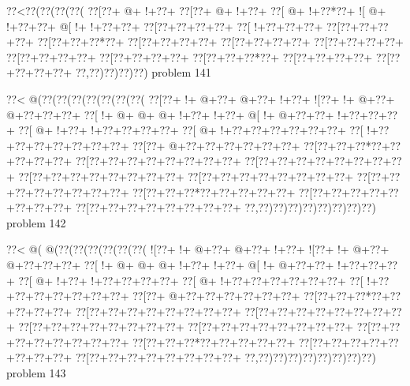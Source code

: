 \vbox{\vbox{\goo
\0??<\0??(\0??(\0??(\0??(
\0??[\0??+\- @+\- !+\0??+
\0??[\0??+\- @+\- !+\0??+
\0??[\- @+\- !+\0??*\0??+
\- ![\- @+\- !+\0??+\0??+
\- @[\- !+\- !+\0??+\0??+
\0??[\0??+\0??+\0??+\0??+
\0??[\- !+\0??+\0??+\0??+
\0??[\0??+\0??+\0??+\0??+
\0??[\0??+\0??+\0??*\0??+
\0??[\0??+\0??+\0??+\0??+
\0??[\0??+\0??+\0??+\0??+
\0??[\0??+\0??+\0??+\0??+
\0??[\0??+\0??+\0??+\0??+
\0??[\0??+\0??+\0??+\0??+
\0??[\0??+\0??+\0??*\0??+
\0??[\0??+\0??+\0??+\0??+
\0??[\0??+\0??+\0??+\0??+
\0??,\0??)\0??)\0??)\0??)
}
\hfil problem 141\hfil\break
}

\vbox{\vbox{\goo
\0??<\- @(\0??(\0??(\0??(\0??(\0??(\0??(\0??(
\0??[\0??+\- !+\- @+\0??+\- @+\0??+\- !+\0??+
\- ![\0??+\- !+\- @+\0??+\- @+\0??+\0??+\0??+
\0??[\- !+\- @+\- @+\- @+\- !+\0??+\- !+\0??+
\- @[\- !+\- @+\0??+\0??+\- !+\0??+\0??+\0??+
\0??[\- @+\- !+\0??+\- !+\0??+\0??+\0??+\0??+
\0??[\- @+\- !+\0??+\0??+\0??+\0??+\0??+\0??+
\0??[\- !+\0??+\0??+\0??+\0??+\0??+\0??+\0??+
\0??[\0??+\- @+\0??+\0??+\0??+\0??+\0??+\0??+
\0??[\0??+\0??+\0??*\0??+\0??+\0??+\0??+\0??+
\0??[\0??+\0??+\0??+\0??+\0??+\0??+\0??+\0??+
\0??[\0??+\0??+\0??+\0??+\0??+\0??+\0??+\0??+
\0??[\0??+\0??+\0??+\0??+\0??+\0??+\0??+\0??+
\0??[\0??+\0??+\0??+\0??+\0??+\0??+\0??+\0??+
\0??[\0??+\0??+\0??+\0??+\0??+\0??+\0??+\0??+
\0??[\0??+\0??+\0??*\0??+\0??+\0??+\0??+\0??+
\0??[\0??+\0??+\0??+\0??+\0??+\0??+\0??+\0??+
\0??[\0??+\0??+\0??+\0??+\0??+\0??+\0??+\0??+
\0??,\0??)\0??)\0??)\0??)\0??)\0??)\0??)\0??)
}
\hfil problem 142\hfil\break
}

\vbox{\vbox{\goo
\0??<\- @(\- @(\0??(\0??(\0??(\0??(\0??(\0??(
\- ![\0??+\- !+\- @+\0??+\- @+\0??+\- !+\0??+
\- ![\0??+\- !+\- @+\0??+\- @+\0??+\0??+\0??+
\0??[\- !+\- @+\- @+\- @+\- !+\0??+\- !+\0??+
\- @[\- !+\- @+\0??+\0??+\- !+\0??+\0??+\0??+
\0??[\- @+\- !+\0??+\- !+\0??+\0??+\0??+\0??+
\0??[\- @+\- !+\0??+\0??+\0??+\0??+\0??+\0??+
\0??[\- !+\0??+\0??+\0??+\0??+\0??+\0??+\0??+
\0??[\0??+\- @+\0??+\0??+\0??+\0??+\0??+\0??+
\0??[\0??+\0??+\0??*\0??+\0??+\0??+\0??+\0??+
\0??[\0??+\0??+\0??+\0??+\0??+\0??+\0??+\0??+
\0??[\0??+\0??+\0??+\0??+\0??+\0??+\0??+\0??+
\0??[\0??+\0??+\0??+\0??+\0??+\0??+\0??+\0??+
\0??[\0??+\0??+\0??+\0??+\0??+\0??+\0??+\0??+
\0??[\0??+\0??+\0??+\0??+\0??+\0??+\0??+\0??+
\0??[\0??+\0??+\0??*\0??+\0??+\0??+\0??+\0??+
\0??[\0??+\0??+\0??+\0??+\0??+\0??+\0??+\0??+
\0??[\0??+\0??+\0??+\0??+\0??+\0??+\0??+\0??+
\0??,\0??)\0??)\0??)\0??)\0??)\0??)\0??)\0??)
}
\hfil problem 143\hfil\break
}

